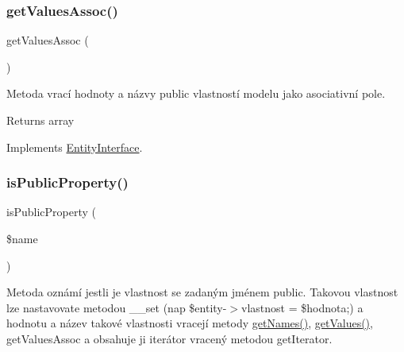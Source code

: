 \mbox{\label{class_pes_1_1_entity_1_1_entity_abstract_a8b5c943485575ffd0388c24998990e22}} 
\subsubsection{\texorpdfstring{get\+Values\+Assoc()}{getValuesAssoc()}}
{\footnotesize\ttfamily get\+Values\+Assoc (\begin{DoxyParamCaption}{ }\end{DoxyParamCaption})}

Metoda vrací hodnoty a názvy public vlastností modelu jako asociativní pole. \begin{DoxyReturn}{Returns}
array 
\end{DoxyReturn}


Implements \mbox{\hyperlink{interface_pes_1_1_entity_1_1_entity_interface}{Entity\+Interface}}.

\mbox{\label{class_pes_1_1_entity_1_1_entity_abstract_aa232b7b1d48256769082d3351dfd5001}} 
\subsubsection{\texorpdfstring{is\+Public\+Property()}{isPublicProperty()}}
{\footnotesize\ttfamily is\+Public\+Property (\begin{DoxyParamCaption}\item[{}]{\$name }\end{DoxyParamCaption})}

Metoda oznámí jestli je vlastnost se zadaným jménem public. Takovou vlastnost lze nastavovate metodou \+\_\+\+\_\+set (nap \$entity-\/$>$vlastnost = \$hodnota;) a hodnotu a název takové vlastnosti vracejí metody \mbox{\hyperlink{class_pes_1_1_entity_1_1_entity_abstract_a64e8191090bf560e825966b082e868f0}{get\+Names()}}, \mbox{\hyperlink{class_pes_1_1_entity_1_1_entity_abstract_a70a0fe08035189260c72e32a9e20d30c}{get\+Values()}}, get\+Values\+Assoc a obsahuje ji iterátor vracený metodou get\+Iterator.


